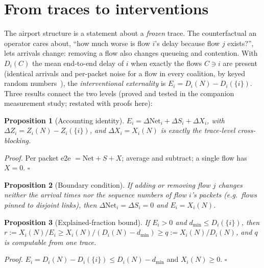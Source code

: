 \documentclass[11pt]{article}
\newtheorem{proposition}{Proposition}
\theoremstyle{definition}
\newcommand{\Net}{\mathrm{Net}}
\begin{document}
\section{From traces to interventions}\label{sec:bridge}
The airport structure is a statement about a \emph{frozen} trace. The counterfactual an operator cares about, ``how much worse is flow $i$'s delay because flow $j$ exists?'', lets arrivals change: removing a flow also changes queueing and contention. With $D_i(C)$ the mean end-to-end delay of $i$ when exactly the flows $C\ni i$ are present (identical arrivals and per-packet noise for a flow in every coalition, by keyed random numbers~\cite{glasserman1992crn}), the \emph{interventional externality} is $E_i=D_i(N)-D_i(\{i\})$. Three results connect the two levels (proved and tested in the companion measurement study; restated with proofs here):
\begin{proposition}[Accounting identity]\label{prop:id}
$E_i=\Delta\Net_i+\Delta S_i+\Delta X_i$, with $\Delta Z_i=Z_i(N)-Z_i(\{i\})$, and $\Delta X_i=X_i(N)$ is exactly the trace-level cross-blocking.
\end{proposition}
\emph{Proof.} Per packet e2e $=\Net+S+X$; average and subtract; a single flow has $X=0$. \hfill$\square$
\begin{proposition}[Boundary condition]\label{prop:boundary}
If adding or removing flow $j$ changes neither the arrival times nor the sequence numbers of flow $i$'s packets (e.g.\ flows pinned to disjoint links), then $\Delta\Net_i=\Delta S_i=0$ and $E_i=X_i(N)$.
\end{proposition}
\begin{proposition}[Explained-fraction bound]\label{prop:cert}
If $E_i>0$ and $d_{\min}\le D_i(\{i\})$, then $r:=X_i(N)/E_i\ge X_i(N)/(D_i(N)-d_{\min})\ge q:=X_i(N)/D_i(N)$, and $q$ is computable from one trace.
\end{proposition}
\emph{Proof.} $E_i=D_i(N)-D_i(\{i\})\le D_i(N)-d_{\min}$ and $X_i(N)\ge0$. \hfill$\square$
\end{document}
